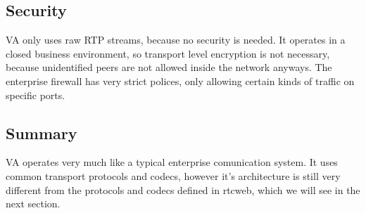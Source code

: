 \subsection{Security}
VA only uses raw RTP streams, because no security is needed. It operates in a closed business environment, so transport level encryption is not necessary, because unidentified peers are not allowed inside the network anyways. The enterprise firewall has very strict polices, only allowing certain kinds of traffic on specific ports.

\subsection*{Summary}
VA operates very much like a typical enterprise comunication system. It uses common transport protocols and codecs, however it's architecture is still very different from the protocols and codecs defined in \gls{rtcweb}, which we will see in the next section.